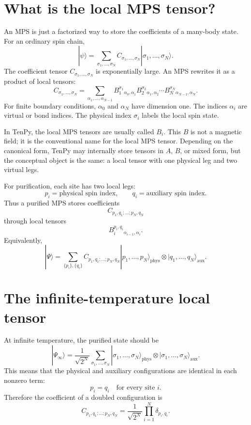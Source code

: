 \documentclass[11pt]{article}
\begin{document}
\section{What is the local MPS tensor?}

An MPS is just a factorized way to store the coefficients of a many-body state.
For an ordinary spin chain,
\[
|\psi\rangle
= \sum_{\sigma_1,\ldots,\sigma_N}
C_{\sigma_1,\ldots,\sigma_N}
|\sigma_1,\ldots,\sigma_N\rangle.
\]
The coefficient tensor \(C_{\sigma_1,\ldots,\sigma_N}\) is exponentially large.
An MPS rewrites it as a product of local tensors:
\[
C_{\sigma_1,\ldots,\sigma_N}
=
\sum_{\alpha_1,\ldots,\alpha_{N-1}}
B_1^{\sigma_1}{}_{\alpha_0,\alpha_1}
B_2^{\sigma_2}{}_{\alpha_1,\alpha_2}
\cdots
B_N^{\sigma_N}{}_{\alpha_{N-1},\alpha_N}.
\]
For finite boundary conditions, \(\alpha_0\) and \(\alpha_N\) have dimension one.
The indices \(\alpha_i\) are virtual or bond indices. The physical index
\(\sigma_i\) labels the local spin state.

In TenPy, the local MPS tensors are usually called \(B_i\). This \(B\) is not a
magnetic field; it is the conventional name for the local MPS tensor. Depending
on the canonical form, TenPy may internally store tensors in \(A\), \(B\), or
mixed form, but the conceptual object is the same: a local tensor with one
physical leg and two virtual legs.

For purification, each site has two local legs:
\[
p_i = \text{physical spin index}, \qquad
q_i = \text{auxiliary spin index}.
\]
Thus a purified MPS stores coefficients
\[
C_{p_1,q_1;\ldots;p_N,q_N}
\]
through local tensors
\[
B_i^{p_i,q_i}{}_{\alpha_{i-1},\alpha_i}.
\]
Equivalently,
\[
|\Psi\rangle
=
\sum_{\{p_i\},\{q_i\}}
C_{p_1,q_1;\ldots;p_N,q_N}
|p_1,\ldots,p_N\rangle_{\mathrm{phys}}
\otimes
|q_1,\ldots,q_N\rangle_{\mathrm{aux}}.
\]

\section{The infinite-temperature local tensor}

At infinite temperature, the purified state should be
\[
|\Psi_\infty\rangle
=
\frac{1}{\sqrt{2^N}}
\sum_{\sigma_1,\ldots,\sigma_N}
|\sigma_1,\ldots,\sigma_N\rangle_{\mathrm{phys}}
\otimes
|\sigma_1,\ldots,\sigma_N\rangle_{\mathrm{aux}}.
\]
This means that the physical and auxiliary configurations are identical in each
nonzero term:
\[
p_i=q_i \quad \text{for every site } i.
\]
Therefore the coefficient of a doubled configuration is
\[
C_{p_1,q_1;\ldots;p_N,q_N}
=
\frac{1}{\sqrt{2^N}}
\prod_{i=1}^N \delta_{p_i,q_i}.
\]
\end{document}
